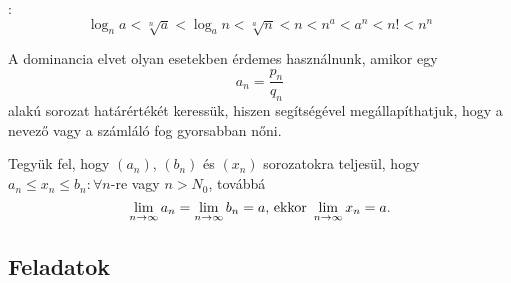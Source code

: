 \documentclass[a4paper, 12pt]{scrartcl}
\begin{document}
\begin{blueBox}
  :
  \[
    \log_n a <
    \sqrt[n]{a} <
    \log_a n <
    \sqrt[a]{n} <
    n <
    n^a <
    a^n <
    n! <
    n^n
  \]
\end{blueBox}

\begin{note}
  A dominancia elvet olyan esetekben érdemes használnunk, amikor egy
  \[
    a_n = \frac{p_n}{q_n}
  \]
  alakú sorozat határértékét keressük, hiszen segítségével megállapíthatjuk,
  hogy a nevező vagy a számláló fog gyorsabban nőni.
\end{note}

\begin{theorem}[Rendőrelv]
  Tegyük fel, hogy $(a_n)$, $(b_n)$ és $(x_n)$ sorozatokra teljesül, hogy $a_n
    \leq x_n \leq b_n : \forall n$-re vagy $n > N_0$, továbbá
  \[
    \lim_{n \rightarrow \infty} a_n = \lim_{n \rightarrow \infty} b_n = a
    \text{, ekkor }
    \lim_{n \rightarrow \infty} x_n = a
    \text.
  \]
\end{theorem}

\subsection{Feladatok}
\end{document}
